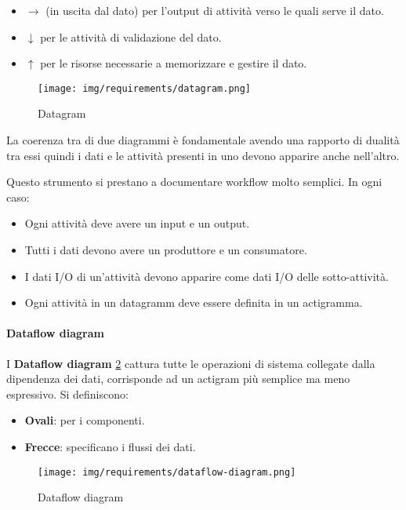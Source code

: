 \begin{enumerate}
\begin{itemize}
                  \item $\to$ (in uscita dal dato) per l'output di attività verso
                        le quali serve il dato.
                  \item $\downarrow$ per le attività di validazione del dato.
                  \item $\uparrow$ per le risorse necessarie a memorizzare e
                        gestire il dato.
            \end{itemize}
            \begin{figure}[!ht]
                  \centering
                  \texttt{[image: img/requirements/datagram.png]}
                  \caption{Datagram}
                  \label{fig:datagram}
            \end{figure}
\end{enumerate}
La coerenza tra di due diagrammi è fondamentale avendo una rapporto di dualità
tra essi quindi i dati e le attività presenti in uno devono apparire anche
nell'altro.

Questo strumento si prestano a documentare workflow molto semplici. In ogni caso:
\begin{itemize}
      \item Ogni attività deve avere un input e un output.
      \item Tutti i dati devono avere un produttore e un consumatore.
      \item I dati I/O di un'attività devono apparire come dati I/O delle
            sotto-attività.
      \item Ogni attività in un datagramm deve essere definita in un actigramma.
\end{itemize}
\paragraph{Dataflow diagram}
I \textbf{Dataflow diagram} \ref{fig:dataflow-diagram} cattura tutte le operazioni
di sistema collegate dalla dipendenza dei dati, corrisponde ad un actigram più
semplice ma meno espressivo. Si definiscono:
\begin{itemize}
      \item \textbf{Ovali}: per i componenti.
      \item \textbf{Frecce}: specificano i flussi dei dati.
\end{itemize}
\begin{figure}[!ht]
      \centering
      \texttt{[image: img/requirements/dataflow-diagram.png]}
      \caption{Dataflow diagram}
      \label{fig:dataflow-diagram}
\end{figure}

